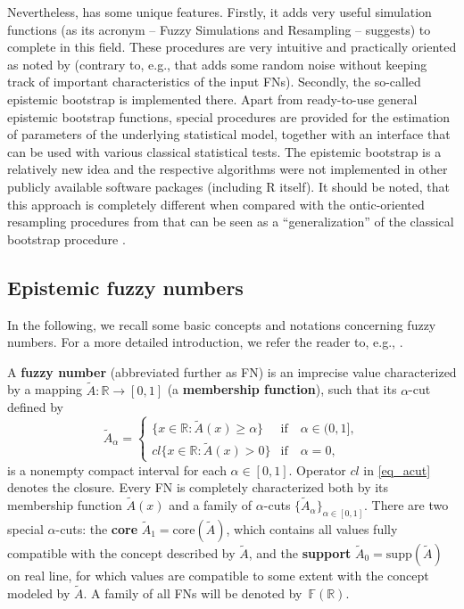 Nevertheless,  has some unique features.
Firstly, it adds very useful simulation functions (as its acronym -- Fuzzy Simulations and Resampling -- suggests) to complete  in this field.
These procedures are very intuitive and practically oriented as noted by \cite{FRV} (contrary to, e.g.,  that adds some random noise without keeping track of important characteristics of the input FNs).
Secondly, the so-called epistemic bootstrap is implemented there.
Apart from ready-to-use general epistemic bootstrap functions, special procedures are provided for the estimation of parameters of the underlying statistical model, together with an interface that can be used with various classical statistical tests.
The epistemic bootstrap is a relatively new idea and the respective algorithms were not implemented in other publicly available software packages (including R itself).
It should be noted, that this approach is completely different when compared with the ontic-oriented resampling procedures from  that can be seen as a ``generalization'' of the classical bootstrap procedure \citep{grzegorzewski_amcs2020,GrzegorzewskiRom2021}.




\subsection{Epistemic fuzzy numbers}

In the following, we recall some basic concepts and notations concerning fuzzy numbers. For a more detailed introduction, we refer the reader to, e.g., \cite{ban_coroianu_pg}.

A \textbf{fuzzy number} (abbreviated further as FN) is an imprecise value characterized by a mapping $\tilde{A}:\mathbb{R}\to [0,1]$ (a \textbf{membership function}), such that its $\alpha$-cut defined by
\begin{equation}
\tilde{A}_{\alpha}=\begin{cases}
\{x\in\mathbb{R}:\tilde{A}(x)\geqslant\alpha\} & \text{if}\quad \alpha\in (0,1], \\
cl\{x\in\mathbb{R}:\tilde{A}(x)>0\} & \text{if}\quad \alpha=0,
\end{cases} \label{eq_acut}
\end{equation}
is a nonempty compact interval for each $\alpha\in [0,1]$. Operator $cl$ in \eqref{eq_acut} denotes the closure. Every FN is completely characterized both by its membership function $\tilde{A}(x)$ and a family of $\alpha$-cuts $\{\tilde{A}_{\alpha}\}_{\alpha\in [0,1]}$. There are two special $\alpha$-cuts: the \textbf{core} $\tilde{A}_1=\mathrm{core}(\tilde{A})$, which contains all values fully compatible with the concept described by $\tilde{A}$, and  the \textbf{support} $\tilde{A}_0=\mathrm{supp}(\tilde{A})$ on real line, for which values are compatible to some extent with the concept modeled by $\tilde{A}$. A family of all FNs will be denoted by~$\mathbb{F}(\mathbb{R})$.

